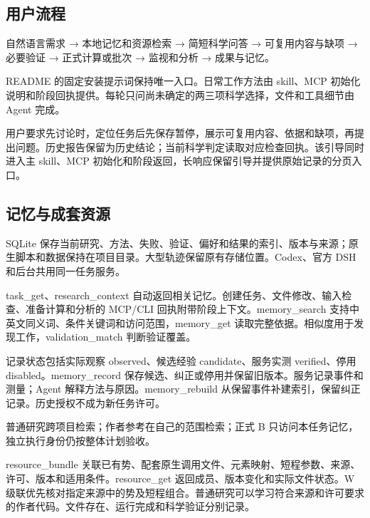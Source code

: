 \documentclass[11pt,a4paper]{ctexart}
\begin{document}
\subsection{用户流程}


自然语言需求 → 本地记忆和资源检索 → 简短科学问答 → 可复用内容与缺项 → 必要验证 → 正式计算或批次 → 监视和分析 → 成果与记忆。



README 的固定安装提示词保持唯一入口。日常工作方法由 skill、MCP 初始化说明和阶段回执提供。每轮只问尚未确定的两三项科学选择，文件和工具细节由 Agent 完成。



用户要求先讨论时，定位任务后先保存暂停，展示可复用内容、依据和缺项，再提出问题。历史报告保留为历史结论；当前科学判定读取对应检查回执。该引导同时进入主 skill、MCP 初始化和阶段返回，长响应保留引导并提供原始记录的分页入口。



\subsection{记忆与成套资源}


SQLite 保存当前研究、方法、失败、验证、偏好和结果的索引、版本与来源；原生脚本和数据保持在项目目录。大型轨迹保留原有存储位置。Codex、官方 DSH 和后台共用同一任务服务。



task\_\allowbreak{}get、research\_\allowbreak{}context 自动返回相关记忆。创建任务、文件修改、输入检查、准备计算和分析的 MCP/\allowbreak{}CLI 回执附带阶段上下文。memory\_\allowbreak{}search 支持中英文同义词、条件关键词和访问范围，memory\_\allowbreak{}get 读取完整依据。相似度用于发现工作，validation\_\allowbreak{}match 判断验证覆盖。



记录状态包括实际观察 observed、候选经验 candidate、服务实测 verified、停用 disabled。memory\_\allowbreak{}record 保存候选、纠正或停用并保留旧版本。服务记录事件和测量；Agent 解释方法与原因。memory\_\allowbreak{}rebuild 从保留事件补建索引，保留纠正记录。历史授权不成为新任务许可。



普通研究跨项目检索；作者参考在自己的范围检索；正式 B 只访问本任务记忆，独立执行身份仍按整体计划验收。



resource\_\allowbreak{}bundle 关联已有势、配套原生调用文件、元素映射、短程参数、来源、许可、版本和适用条件。resource\_\allowbreak{}get 返回成员、版本变化和实际文件状态。W 级联优先核对指定来源中的势及短程组合。普通研究可以学习符合来源和许可要求的作者代码。文件存在、运行完成和科学验证分别记录。
\end{document}
